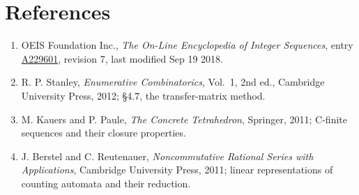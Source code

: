 \documentclass[11pt]{article}
\theoremstyle{definition}
\begin{document}
\section{References}

\begin{enumerate}

\item OEIS Foundation Inc., \emph{The On-Line Encyclopedia of Integer Sequences}, entry \href{https://oeis.org/A229601}{A229601}, revision 7, last modified Sep 19 2018.

\item R. P. Stanley, \emph{Enumerative Combinatorics}, Vol.~1, 2nd ed., Cambridge University Press, 2012; \S4.7, the transfer-matrix method.

\item M. Kauers and P. Paule, \emph{The Concrete Tetrahedron}, Springer, 2011; C-finite sequences and their closure properties.

\item J. Berstel and C. Reutenauer, \emph{Noncommutative Rational Series with Applications}, Cambridge University Press, 2011; linear representations of counting automata and their reduction.

\end{enumerate}
\end{document}

